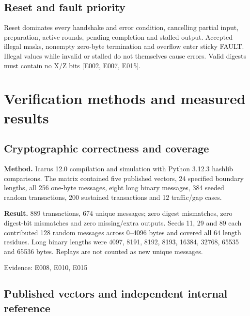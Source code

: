 \documentclass[11pt,a4paper]{article}
\begin{document}
\subsection{Reset and fault priority}

Reset dominates every handshake and error condition,\allowbreak{} cancelling partial input,\allowbreak{} preparation,\allowbreak{} active rounds,\allowbreak{} pending completion and stalled output. Accepted illegal masks,\allowbreak{} nonempty zero-byte termination and overflow enter sticky FAULT. Illegal values while invalid or stalled do not themselves cause errors. Valid digests must contain no X/\allowbreak{}Z bits [\allowbreak{}E002,\allowbreak{} E007,\allowbreak{} E015]\allowbreak{}.

\section{Verification methods and measured results}

\subsection{Cryptographic correctness and coverage}

\textbf{Method.} Icarus 12.0 compilation and simulation with Python 3.12.3 hashlib comparisons. The matrix contained five published vectors,\allowbreak{} 24 specified boundary lengths,\allowbreak{} all 256 one-byte messages,\allowbreak{} eight long binary messages,\allowbreak{} 384 seeded random transactions,\allowbreak{} 200 sustained transactions and 12 traffic/\allowbreak{}gap cases.

\textbf{Result.} 889 transactions,\allowbreak{} 674 unique messages; zero digest mismatches,\allowbreak{} zero digest-bit mismatches and zero missing/\allowbreak{}extra outputs. Seeds 11,\allowbreak{} 29 and 89 each contributed 128 random messages across 0–4096 bytes and covered all 64 length residues. Long binary lengths were 4097,\allowbreak{} 8191,\allowbreak{} 8192,\allowbreak{} 8193,\allowbreak{} 16384,\allowbreak{} 32768,\allowbreak{} 65535 and 65536 bytes. Replays are not counted as new unique messages.

{\small Evidence: E008,\allowbreak{} E010,\allowbreak{} E015}

\subsection{Published vectors and independent internal reference}
\end{document}
